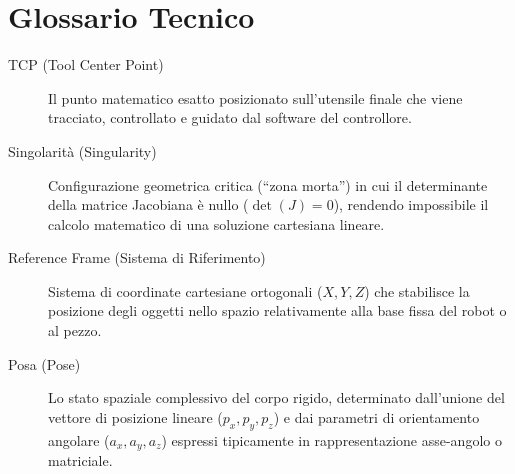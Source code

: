 \newpage
\section*{Glossario Tecnico}
%
\noindent{\large\sffamily\bfseries\textcolor{black!60}{Robotics Programming}}\par
\begin{description}
    \item [TCP (Tool Center Point)] Il punto matematico esatto posizionato sull'utensile finale che viene tracciato, controllato e guidato dal software del controllore.
    \item [Singolarità (Singularity)] Configurazione geometrica critica (``zona morta'') in cui il determinante della matrice Jacobiana è nullo ($\det(J)=0$), rendendo impossibile il calcolo matematico di una soluzione cartesiana lineare.
    \item [Reference Frame (Sistema di Riferimento)] Sistema di coordinate cartesiane ortogonali ($X, Y, Z$) che stabilisce la posizione degli oggetti nello spazio relativamente alla base fissa del robot o al pezzo.
    \item [Posa (Pose)] Lo stato spaziale complessivo del corpo rigido, determinato dall'unione del vettore di posizione lineare ($p_x, p_y, p_z$) e dai parametri di orientamento angolare ($a_x, a_y, a_z$) espressi tipicamente in rappresentazione asse-angolo o matriciale.
\end{description}

